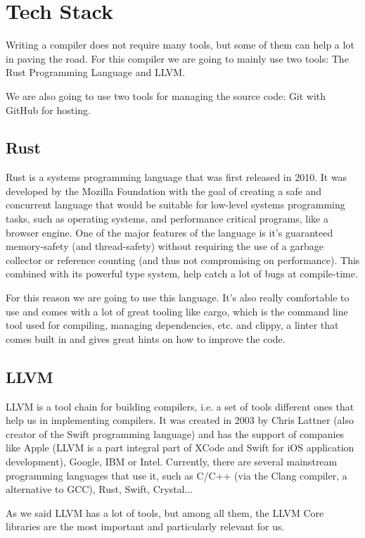 ﻿\documentclass[10pt,a4paper,twocolumn,twoside]{article}
\begin{document}
\section{Tech Stack}

Writing a compiler does not require many tools, but some of them can help a lot
in paving the road. For this compiler we are going to mainly use two tools: 
The Rust Programming Language and LLVM.

We are also going to use two tools for managing the source code: Git with GitHub
for hosting.

\subsection{Rust}
Rust is a systems programming language that was first released in 2010. It was
developed by the Mozilla Foundation with the goal of creating a safe and
concurrent language that would be suitable for low-level systems programming
tasks, such as operating systems, and performance critical programs, like a
browser engine. One of the major features of the language is it's guaranteed
memory-safety (and thread-safety) without requiring the use of a garbage
collector or reference counting (and thus not compromising on performance).
This combined with its powerful type system, help catch a lot of bugs at 
compile-time.

For this reason we are going to use this language. It's also really comfortable
to use and comes with a lot of great tooling like cargo, which is the command 
line tool used for compiling, managing dependencies, etc. and clippy, a linter
that comes built in and gives great hints on how to improve the code.

\subsection{LLVM}
LLVM is a tool chain for building compilers, i.e. a set of tools different ones
that help us in implementing compilers. It was created in 2003 by Chris Lattner
(also creator of the Swift programming language) and has the support of
companies like Apple (LLVM is a part integral part of XCode and Swift for iOS
application development), Google, IBM or Intel. Currently, there are several
mainstream programming languages that use it, such as C/C++ (via the Clang
compiler, a alternative to GCC), Rust, Swift, Crystal...

As we said LLVM has a lot of tools, but among all them, the LLVM Core libraries
are the most important and particularly relevant for us. 
\end{document}
